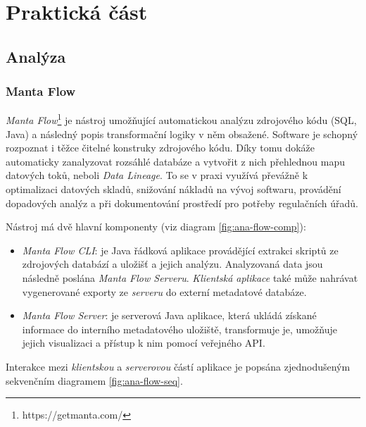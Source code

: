 \chapter{Praktická část}

\section{Analýza}


\subsection{Manta Flow}
\textit{Manta Flow}\footnote{https://getmanta.com/} je nástroj umožňující automatickou analýzu zdrojového kódu (SQL, Java) a následný popis transformační logiky v něm obsažené. Software je schopný rozpoznat i těžce čitelné konstruky zdrojového kódu. Díky tomu dokáže automaticky zanalyzovat rozsáhlé databáze a vytvořit z nich přehlednou mapu datových toků, neboli \textit{Data Lineage}. To se v praxi využívá převážně k optimalizaci datových skladů, snižování nákladů na vývoj softwaru, provádění dopadových analýz a při dokumentování prostředí pro potřeby regulačních úřadů.

Nástroj má dvě hlavní komponenty (viz diagram \ref{fig:ana-flow-comp}): 
\begin{itemize}
	\item{\textit{Manta Flow CLI}}: je Java řádková aplikace provádějící extrakci skriptů ze zdrojových databází a uložišť a jejich analýzu. Analyzovaná data jsou následně poslána \textit{Manta Flow Serveru}. \textit{Klientská aplikace} také může nahrávat vygenerované exporty ze \textit{serveru} do externí metadatové databáze. 
	\item{\textit{Manta Flow Server}}: je serverová Java aplikace, která ukládá získané informace do interního metadatového uložiště, transformuje je, umožňuje jejich visualizaci a přístup k nim pomocí veřejného API. 
\end{itemize}

Interakce mezi \textit{klientskou} a \textit{serverovou} částí aplikace je popsána zjednodušeným sekvenčním diagramem \ref{fig:ana-flow-seq}. 

